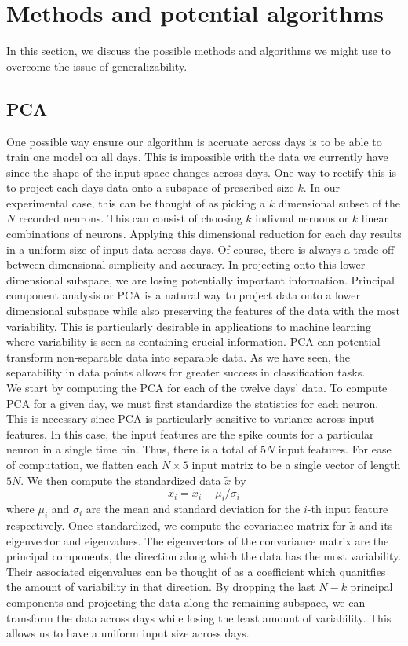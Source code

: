 \documentclass[12pt]{article}
\begin{document}
\section{Methods and potential algorithms}
In this section, we discuss the possible methods and algorithms we might use to overcome the issue of generalizability.
\subsection{PCA}
One possible way ensure our algorithm is accruate across days is to be able to train one model on all days. This is impossible with the data we currently have since the shape of the input space changes across days. One way to rectify this is to project each days data onto a subspace of prescribed size $k$. In our experimental case, this can be thought of as picking a $k$ dimensional subset of the $N$ recorded neurons. This can consist of choosing $k$ indivual neruons or $k$ linear combinations of neurons. Applying this dimensional reduction for each day results in a uniform size of input data across days. Of course, there is always a trade-off between dimensional simplicity and accuracy. In projecting onto this lower dimensional subspace, we are losing potentially important information. Principal component analysis or PCA is a natural way to project data onto a lower dimensional subspace while also preserving the features of the data with the most variability. This is particularly desirable in applications to machine learning where variability is seen as containing crucial information. PCA can potential transform non-separable data into separable data. As we have seen, the separability in data points allows for greater success in classification tasks.\\
We start by computing the PCA for each of the twelve days' data. To compute PCA for a given day, we must first standardize the statistics for each neuron. This is necessary since PCA is particularly sensitive to variance across input features. In this case, the input features are the spike counts for a particular neuron in a single time bin. Thus, there is a total of $5N$ input features.  For ease of computation, we  flatten each $N\times5$ input matrix to be a single vector of length $5N$.  We then compute the standardized data $\tilde{x}$ by
$$ \tilde{x_i} = x_i - \mu_i / \sigma_i $$
where $\mu_i$ and $\sigma_i$ are the mean and standard deviation for the $i$-th input feature respectively. Once standardized, we compute the covariance matrix for $\tilde{x}$ and its eigenvector and eigenvalues. The eigenvectors of the convariance matrix are the principal components, the direction along which the data has the most variability. Their associated eigenvalues can be thought of as a coefficient which quanitfies the amount of variability in that direction. By dropping the last $N-k$ principal components and projecting the data along the remaining subspace, we can transform the data across days while losing the least amount of variability. This allows us to have a uniform input size across days. \\
\end{document}
